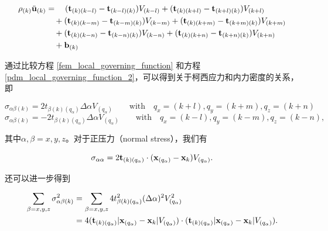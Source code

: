 \begin{equation}
\begin{aligned}
\rho_{(k)}\ddot{\mathbf{u}}_{(k)} &= \quad (\mathbf{t}_{(k)(k-l)} - \mathbf{t}_{(k-l)(k)})V_{(k-l)} + (\mathbf{t}_{(k)(k+l)} - \mathbf{t}_{(k+l)(k)})V_{(k+l)}\\
                             &\quad + (\mathbf{t}_{(k)(k-m)} - \mathbf{t}_{(k-m)(k)})V_{(k-m)} + (\mathbf{t}_{(k)(k+m)} - \mathbf{t}_{(k+m)(k)})V_{(k+m)}\\
                             &\quad + (\mathbf{t}_{(k)(k-n)} - \mathbf{t}_{(k-n)(k)})V_{(k-n)} + (\mathbf{t}_{(k)(k+n)} - \mathbf{t}_{(k+n)(k)})V_{(k+n)}\\
                             &\quad  + \mathbf{b}_{(k)}
\label{pdm_local_governing_function_2}
\end{aligned}
\end{equation}

通过比较方程 \ref{fem_local_governing_function} 和方程 \ref{pdm_local_governing_function_2}，可以得到关于柯西应力和内力密度的关系，即

\begin{equation}
\sigma_{\alpha\beta(k)} = 2t_{\beta(k)(q_\alpha)}\Delta\alpha V_{(q_\alpha)}\qquad \mathrm{with } \quad q_x=(k+l),q_y=(k+m),q_z=(k+n)
\label{eq:7}
\end{equation}
\begin{equation}
\sigma_{\alpha\beta(k)} = -2t_{\beta(k)(q_\alpha)}\Delta\alpha V_{(q_\alpha)}\qquad \mathrm{with } \quad q_x=(k-l),q_y=(k-m),q_z=(k-n),
\label{eq:8}
\end{equation}

其中$\alpha,\beta=x,y,z$。对于正压力（normal stress），我们有

\begin{equation}
\sigma_{\alpha\alpha} = 2 \mathbf{t}_{(k)(q_\alpha)}\cdot(\mathbf{x}_{(q_\alpha)}-\mathbf{x}_{k})V_{(q_\alpha)}.
\label{eq:9}
\end{equation}

还可以进一步得到

\begin{equation}
\begin{aligned}
\sum_{\beta=x,y,z}\sigma_{\alpha\beta(k)}^2 &= \sum_{\beta=x,y,z}4t_{\beta(k)(q_\alpha)}^2(\Delta\alpha)^2 V_{(q_\alpha)}^2 \\
                                            &= 4(\mathbf{t}_{(k)(q_\alpha)}|\mathbf{x}_{(q_\alpha)}-\mathbf{x}_{k}|V_{(q_\alpha)})
                                                 \cdot
                                                (\mathbf{t}_{(k)(q_\alpha)}|\mathbf{x}_{(q_\alpha)}-\mathbf{x}_{k}|V_{(q_\alpha)}).
\end{aligned}
\label{eq:10}
\end{equation}

